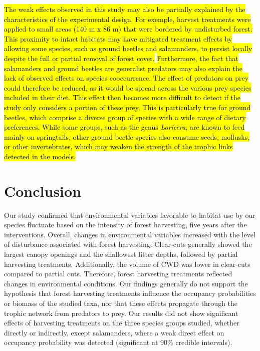 \hl{The weak effects observed in this study may also be partially explained by the characteristics of the experimental design. 
For exemple, harvest treatments were applied to small areas (140 m x 86 m) that were bordered by undisturbed forest. 
This proximity to intact habitats may have mitigated treatment effects by allowing some species, such as ground beetles and salamanders, 
to persist locally despite the full or partial removal of forest cover. }
\hl{Furthermore, the fact that salamanders and ground beetles are generalist predators may also explain the lack of observed effects on species cooccurrence. 
The effect of predators on prey could therefore be reduced, as it would be spread across the various prey species included in their diet. 
This effect then becomes more difficult to detect if the study only considers a portion of these prey. 
This is particularly true for ground beetles, which comprise a diverse group of species with a wide range of dietary preferences. 
While some groups, such as the genus \textit{Loricera}, are known to feed mainly on springtails, other ground beetle species also consume seeds, mollusks, or other invertebrates, 
which may weaken the strength of the trophic links detected in the models. }





\section*{Conclusion}
\label{sec:conclu1}

Our study confirmed that environmental variables favorable to habitat use by our species fluctuate based on the intensity of forest harvesting, five years after the interventions. 
Overall, changes in environmental variables increased with the level of disturbance associated with forest harvesting. 
Clear-cuts generally showed the largest canopy openings and the shallowest litter depths, followed by partial harvesting treatments. 
Additionally, the volume of CWD was lower in clear-cuts compared to partial cuts. 
Therefore, forest harvesting treatments reflected changes in environmental conditions. 
Our findings generally do not support the hypothesis that forest harvesting treatments influence the occupancy probabilities or biomass of the studied taxa, nor that these effects propagate through the trophic network from predators to prey. 
Our results did not show significant effects of harvesting treatments on the three species groups studied, whether directly or indirectly, 
except salamanders, where a weak direct effect on occupancy probability was detected (significant at 90\% credible intervals). 

